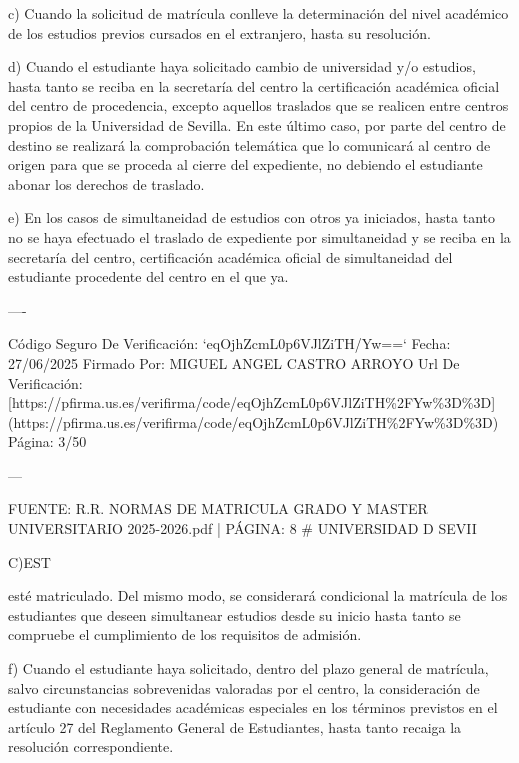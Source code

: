 \documentclass{article}
\begin{document}
\begin{itemize}
\begin{itemize}
\begin{scriptsize}
                  c) Cuando la solicitud de matrícula conlleve la determinación del nivel académico de los estudios previos cursados en el extranjero, hasta su resolución.

                  d) Cuando el estudiante haya solicitado cambio de universidad y/o estudios, hasta tanto se reciba en la secretaría del centro la certificación académica oficial del centro de procedencia, excepto aquellos traslados que se realicen entre centros propios de la Universidad de Sevilla. En este último caso, por parte del centro de destino se realizará la comprobación telemática que lo comunicará al centro de origen para que se proceda al cierre del expediente, no debiendo el estudiante abonar los derechos de traslado.

                  e) En los casos de simultaneidad de estudios con otros ya iniciados, hasta tanto no se haya efectuado el traslado de expediente por simultaneidad y se reciba en la secretaría del centro, certificación académica oficial de simultaneidad del estudiante procedente del centro en el que ya.

                  ----

                  Código Seguro De Verificación: `eqOjhZcmL0p6VJlZiTH/Yw==`
                  Fecha: 27/06/2025
                  Firmado Por: MIGUEL ANGEL CASTRO ARROYO
                  Url De Verificación: [https://pfirma.us.es/verifirma/code/eqOjhZcmL0p6VJlZiTH\%2FYw\%3D\%3D](https://pfirma.us.es/verifirma/code/eqOjhZcmL0p6VJlZiTH\%2FYw\%3D\%3D)
                  Página: 3/50

                  ---

                  FUENTE: R.R. NORMAS DE MATRICULA GRADO Y MASTER UNIVERSITARIO 2025-2026.pdf | PÁGINA: 8
                  \# UNIVERSIDAD D SEVII

                  C)EST

                  esté matriculado. Del mismo modo, se considerará condicional la matrícula de los estudiantes que deseen simultanear estudios desde su inicio hasta tanto se compruebe el cumplimiento de los requisitos de admisión.

                  f) Cuando el estudiante haya solicitado, dentro del plazo general de matrícula, salvo circunstancias sobrevenidas valoradas por el centro, la consideración de estudiante con necesidades académicas especiales en los términos previstos en el artículo 27 del Reglamento General de Estudiantes, hasta tanto recaiga la resolución correspondiente.


\end{scriptsize}
\end{itemize}
\end{itemize}
\end{document}
